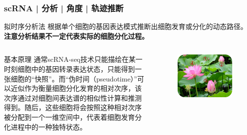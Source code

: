 \documentclass[11pt]{ctexbeamer}
\begin{document}
\begin{frame}
	\frametitle{scRNA | 分析 | 角度 | 轨迹推断}
	\begin{block}{拟时序分析法}
		根据单个细胞的基因表达模式推断出细胞发育或分化的动态路径。\textbf{注意分析结果不一定代表实际的细胞分化过程。}
    \end{block}
\pause
    \begin{columns}
    	\begin{block}{基本原理}
    		通常scRNA-seq技术只能描绘在某一时刻细胞中的基因转录表达状态，只能得到一张细胞的“快照”。而“伪时间（pseudotime）”可以近似作为衡量细胞分化发育的相对次序，该次序通过对细胞间表达谱的相似性计算和推测得到。随后，这些细胞将会按照这种相对次序被分配到一个一维空间中，代表着细胞发育分化进程中的一种独特状态。
    	\end{block}
    	\begin{figure}
    		\includegraphics[width=\textwidth]{scRNA_pseudotime.png}
    	\end{figure}
    \end{columns}
\end{frame}
\end{document}
